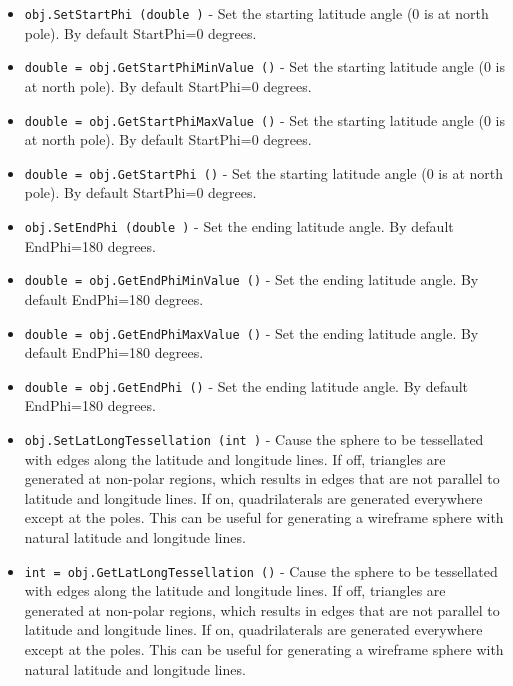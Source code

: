 \begin{itemize}
\item  \verb|obj.SetStartPhi (double )| -  Set the starting latitude angle (0 is at north pole). By default
 StartPhi=0 degrees.

\item  \verb|double = obj.GetStartPhiMinValue ()| -  Set the starting latitude angle (0 is at north pole). By default
 StartPhi=0 degrees.

\item  \verb|double = obj.GetStartPhiMaxValue ()| -  Set the starting latitude angle (0 is at north pole). By default
 StartPhi=0 degrees.

\item  \verb|double = obj.GetStartPhi ()| -  Set the starting latitude angle (0 is at north pole). By default
 StartPhi=0 degrees.

\item  \verb|obj.SetEndPhi (double )| -  Set the ending latitude angle. By default EndPhi=180 degrees.

\item  \verb|double = obj.GetEndPhiMinValue ()| -  Set the ending latitude angle. By default EndPhi=180 degrees.

\item  \verb|double = obj.GetEndPhiMaxValue ()| -  Set the ending latitude angle. By default EndPhi=180 degrees.

\item  \verb|double = obj.GetEndPhi ()| -  Set the ending latitude angle. By default EndPhi=180 degrees.

\item  \verb|obj.SetLatLongTessellation (int )| -  Cause the sphere to be tessellated with edges along the latitude
 and longitude lines. If off, triangles are generated at non-polar
 regions, which results in edges that are not parallel to latitude and
 longitude lines. If on, quadrilaterals are generated everywhere
 except at the poles. This can be useful for generating a wireframe
 sphere with natural latitude and longitude lines.

\item  \verb|int = obj.GetLatLongTessellation ()| -  Cause the sphere to be tessellated with edges along the latitude
 and longitude lines. If off, triangles are generated at non-polar
 regions, which results in edges that are not parallel to latitude and
 longitude lines. If on, quadrilaterals are generated everywhere
 except at the poles. This can be useful for generating a wireframe
 sphere with natural latitude and longitude lines.


\end{itemize}
